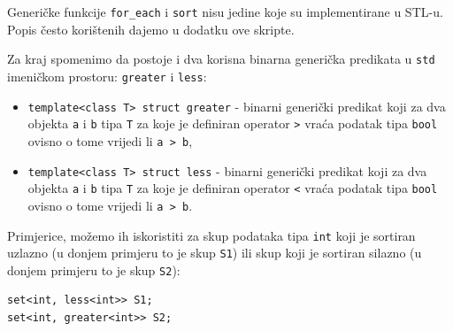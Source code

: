 Generičke funkcije \texttt{for\_each} i \texttt{sort} nisu jedine koje su implementirane u STL-u.
Popis često korištenih dajemo u dodatku ove skripte.
\medskip

Za kraj spomenimo da postoje i dva korisna binarna generička predikata u \texttt{std} imeničkom prostoru:
\texttt{greater} i \texttt{less}:

\begin{itemize}
    \item 
    \texttt{template<class T> struct greater}
    - binarni generički predikat koji za dva objekta \texttt{a} i \texttt{b}
    tipa \texttt{T} za koje je definiran operator \texttt{>} vraća podatak tipa \texttt{bool} ovisno o tome vrijedi li \texttt{a > b},

    \item 
    \texttt{template<class T> struct less}
    - binarni generički predikat koji za dva objekta \texttt{a} i \texttt{b}
    tipa \texttt{T} za koje je definiran operator \texttt{<} vraća podatak tipa \texttt{bool} ovisno o tome vrijedi li \texttt{a > b}.
\end{itemize}

Primjerice, možemo ih iskoristiti za skup podataka tipa \texttt{int} 
koji je sortiran uzlazno (u donjem primjeru to je skup \texttt{S1})
ili skup koji je sortiran silazno
(u donjem primjeru to je skup \texttt{S2}):

\begin{verbatim}
set<int, less<int>> S1;
set<int, greater<int>> S2;
\end{verbatim}